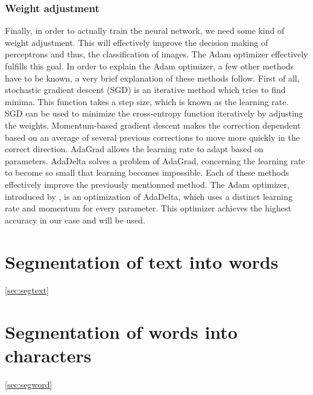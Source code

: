 \documentclass{article}
\begin{document}
 \subsubsection{Weight adjustment}
Finally, in order to actually train the neural network, we need some kind of weight adjustment. This will effectively improve the decision making of perceptrons and thus, the classification of images. 
The Adam optimizer effectively fulfills this goal. In order to explain the Adam optimizer, a few other methods have to be known, a very brief explanation of these methods follow. 
First of all, stochastic gradient descent (SGD) is an iterative method which tries to find minima. This function takes a step size, which is known as the learning rate. SGD can be used to minimize the cross-entropy function iteratively by adjusting the weights. 
Momentum-based gradient descent makes the correction dependent based on an average of several previous corrections to move more quickly in the correct direction. 
AdaGrad allows the learning rate to adapt based on parameters. AdaDelta solves a problem of AdaGrad, concerning the learning rate to become so small that learning becomes impossible. 
Each of these methods effectively improve the previously mentionned method. 
The Adam optimizer, introduced by \cite{adam}, is an optimization of AdaDelta, which uses a distinct learning rate and momentum for every parameter. This optimizer achieves the highest accuracy in our case and will be used. 

\section{Segmentation of text into words}
\ref{sec:segtext}
\section{Segmentation of words into characters}
\ref{sec:segword}
\end{document}
